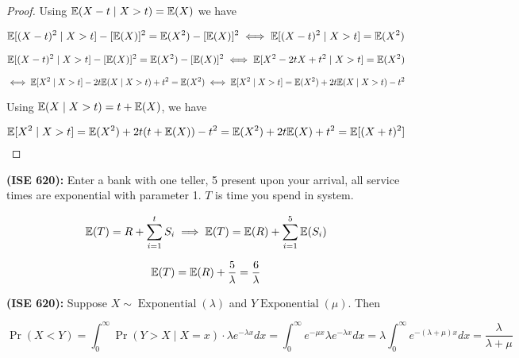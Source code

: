 \begin{itemize}
\begin{proof}
Using \(\mathbb{E}(X-t \mid X > t) = \mathbb{E}(X)\) we have

\[
 \mathbb{E}[(X-t)^2 \mid X > t] - [\mathbb{E}(X)]^2 = \mathbb{E}(X^2)- [\mathbb{E}(X)]^2 \iff   \mathbb{E}[(X-t)^2 \mid X > t]   = \mathbb{E}(X^2)
\]

\[
 \mathbb{E}[(X-t)^2 \mid X > t] - [\mathbb{E}(X)]^2 = \mathbb{E}(X^2)- [\mathbb{E}(X)]^2 \iff  \mathbb{E}[X^2-2tX + t^2 \mid X > t]  = \mathbb{E}(X^2)
\]

\[
\iff \mathbb{E}[X^2 \mid X >t ] -2t \mathbb{E}(X \mid X > t)  + t^2 = \mathbb{E}(X^2) \iff \mathbb{E}[X^2 \mid X >t ] = \mathbb{E}(X^2) + 2 t \mathbb{E}(X \mid X > t) - t^2
\]

Using \(\mathbb{E}(X \mid X > t)  = t + \mathbb{E}(X)\), we have

\[
 \mathbb{E}[X^2 \mid X >t ] = \mathbb{E}(X^2) + 2 t(t + \mathbb{E}(X)) - t^2 = \mathbb{E}(X^2) + 2t \mathbb{E}(X) +  t^2 = \mathbb{E}[(X + t)^2]
\]
\end{proof}

\end{itemize}

\begin{example} \textbf{(ISE 620):} Enter a bank with one teller, 5 present upon your arrival, all service times are exponential with parameter 1. \(T\) is time you spend in system.

\[
\mathbb{E}(T) = R + \sum_{i=1}^t S_i \implies \mathbb{E}(T) = \mathbb{E}(R) + \sum_{i=1}^5 \mathbb{E}(S_i)
\]

\[
\mathbb{E}(T) = \mathbb{E}(R) + \frac{5}{\lambda} = \frac{6}{\lambda}
\]

\end{example}

\begin{example} \textbf{(ISE 620):} Suppose \(X \sim \operatorname{Exponential}(\lambda)\) and \(Y \operatorname{Exponential}(\mu)\). Then

\[
\Pr( X < Y) = \int_0^\infty \Pr(Y > X \mid X=x) \cdot \lambda e^{-\lambda x} dx = \int_0^\infty e^{- \mu x} \lambda e^{-\lambda x} dx = \lambda \int_0^\infty e ^{-(\lambda+\mu)x} dx = \boxed{\frac{\lambda}{\lambda+\mu}}
\]

\end{example}

